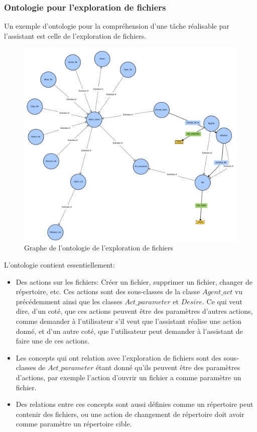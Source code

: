 \subsubsection*{Ontologie pour l'exploration de fichiers}\label{onto2}
Un exemple d'ontologie pour la compréhension d'une tâche réalisable par l'assistant est celle de l'exploration de fichiers.
\begin{figure}[H] 
	
	\centering
	\includegraphics[width=0.95\linewidth]{images/Conception/DM/onto_browser.png}
	\caption{Graphe de l'ontologie de l'exploration de fichiers}
\end{figure}\label{onto_browser}
L'ontologie contient essentiellement:
\begin{itemize}
	\item Des actions sur les fichiers: Créer un fichier, supprimer un fichier, changer de répertoire, etc. Ces actions sont des sous-classes de la classe  $Agent\_act$ vu précédemment ainsi que les classes $Act\_parameter$ et $Desire$. Ce qui veut dire, d'un coté, que ces actions peuvent être des paramètres d'autres actions, comme demander à l'utilisateur s'il veut que l'assistant réalise une action donné, et d'un autre coté, que l'utilisateur peut demander à l'assistant de faire une de ces actions. 
	\item Les concepts qui ont relation avec l'exploration de fichiers sont des sous-classes de $Act\_parameter$ étant donné qu'ils peuvent  être des paramètres d'actions, par exemple l'action d'ouvrir un fichier a comme paramètre un fichier.
	\item Des relations entre ces concepts sont aussi définies comme un répertoire peut contenir des fichiers, ou une action de changement de répertoire doit avoir comme paramètre un répertoire cible.
\end{itemize}
